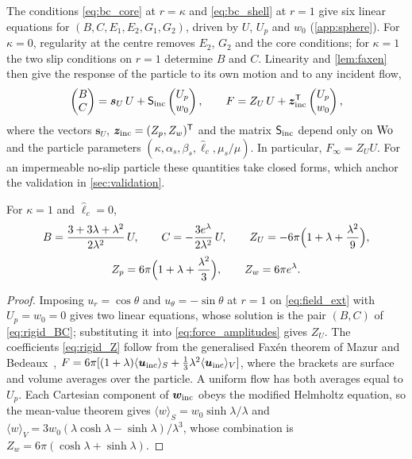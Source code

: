 The conditions \eqref{eq:bc_core} at $r=\kappa$ and \eqref{eq:bc_shell} at $r=1$ give six linear equations for
$(B,C,E_1,E_2,G_1,G_2)$, driven by $U$, $U_p$ and $w_0$ (\cref{app:sphere}). For $\kappa=0$, regularity at the centre
removes $E_2$, $G_2$ and the core conditions; for $\kappa=1$ the two slip conditions on $r=1$ determine $B$ and $C$.
Linearity and \cref{lem:faxen} then give the response of the particle to its own motion and to any incident flow,
\begin{equation}
  \begin{pmatrix}B\\ C\end{pmatrix}=\bm s_U\,U+\mathsf S_{\rm inc}\begin{pmatrix}U_p\\ w_0\end{pmatrix},
  \qquad
  F=Z_U\,U+\bm z_{\rm inc}^{\mathsf T}\begin{pmatrix}U_p\\ w_0\end{pmatrix},
  \label{eq:response}
\end{equation}
where the vectors $\bm s_U$, $\bm z_{\rm inc}=(Z_p,Z_w)^{\mathsf T}$ and the matrix $\mathsf S_{\rm inc}$ depend only on
$\mathrm{Wo}$ and the particle parameters $(\kappa,\alpha_s,\beta_s,\hat\ell_c,\mu_s/\mu)$. In particular, $F_\infty=Z_UU$. For
an impermeable no-slip particle these quantities take closed forms, which anchor the validation in
\cref{sec:validation}.

\begin{proposition}\label{prop:rigid}
For $\kappa=1$ and $\hat\ell_c=0$,
\begin{equation}
  B=\frac{3+3\lambda+\lambda^2}{2\lambda^2}\,U,\qquad C=-\frac{3e^{\lambda}}{2\lambda^2}\,U,\qquad
  Z_U=-6\pi\Bigl(1+\lambda+\frac{\lambda^2}{9}\Bigr),
  \label{eq:rigid_BC}
\end{equation}
\begin{equation}
  Z_p=6\pi\Bigl(1+\lambda+\frac{\lambda^2}{3}\Bigr),\qquad Z_w=6\pi e^{\lambda}.
  \label{eq:rigid_Z}
\end{equation}
\end{proposition}
\begin{proof}
Imposing $u_r=\cos\theta$ and $u_\theta=-\sin\theta$ at $r=1$ on \cref{eq:field_ext} with $U_p=w_0=0$ gives two linear
equations, whose solution is the pair $(B,C)$ of \cref{eq:rigid_BC}; substituting it into \cref{eq:force_amplitudes}
gives $Z_U$. The coefficients \eqref{eq:rigid_Z} follow from the generalised Faxén theorem of Mazur and
Bedeaux~\cite{mazur1974generalization}, $F=6\pi[(1+\lambda)\langle\bm{u}_{\rm inc}\rangle_S+\tfrac13\lambda^2\langle\bm{u}_{\rm
inc}\rangle_V]$, where the brackets are surface and volume averages over the particle. A uniform flow has both averages
equal to $U_p$. Each Cartesian component of $\bm w_{\rm inc}$ obeys the modified Helmholtz equation, so the mean-value
theorem gives $\langle w\rangle_S=w_0\sinh\lambda/\lambda$ and $\langle w\rangle_V=3w_0(\lambda\cosh\lambda-\sinh\lambda)/\lambda^3$,
whose combination is $Z_w=6\pi(\cosh\lambda+\sinh\lambda)$.
\end{proof}

